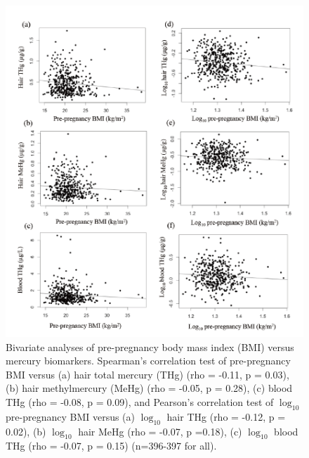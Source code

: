 \begin{figure}
  \centering
    \label{fig:Fig39}
  \includegraphics[scale=1]{Figures/Fig39.pdf}
  \caption[Bivariate analyses of pre-pregnancy body mass index versus mercury biomarkers]{Bivariate analyses of pre-pregnancy body mass index (BMI) versus mercury biomarkers. Spearman's correlation test of pre-pregnancy BMI versus (a) hair total mercury (THg) (rho = -0.11, p = 0.03), (b) hair methylmercury (MeHg) (rho = -0.05, p = 0.28), (c) blood THg (rho = -0.08, p = 0.09), and Pearson's correlation test of $\log_{10}$ pre-pregnancy BMI versus (a) $\log_{10}$ hair THg (rho = -0.12, p = 0.02), (b) $\log_{10}$ hair MeHg (rho = -0.07, p =0.18), (c) $\log_{10}$ blood THg (rho = -0.07, p = 0.15) (n=396-397 for all).}
\end{figure}

